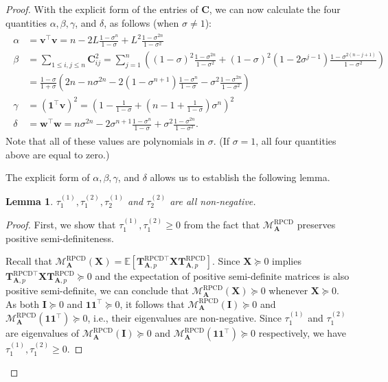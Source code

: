 \documentclass{article}
\theoremstyle{plain}
\newtheorem{lemma}[theorem]{Lemma}
\theoremstyle{definition}
\theoremstyle{remark}
\def\bigopen#1{\left(#1\right)}
\newcommand{\RPCD}{\text{RPCD}} %
\newcommand{\MARPCD}{\mathcal{M}_{\bm{A}}^{\RPCD}} %
\def\vone{{\bm{1}}}
\def\vv{{\bm{v}}}
\def\vw{{\bm{w}}}
\def\mA{{\bm{A}}}
\def\mC{{\bm{C}}}
\def\mI{{\bm{I}}}
\def\mT{{\bm{T}}}
\def\mX{{\bm{X}}}
\newcommand{\E}{\mathbb{E}}
\begin{document}
\begin{proof}
With the explicit form of the entries of $\mC$, we can now calculate the four quantities $\alpha, \beta, \gamma$, and $\delta$, as follows (when $\sigma \ne 1$):
\begin{align}
\begin{aligned}
\alpha &= \vv^{\top} \vv =  n - 2L\frac{1-\sigma^n}{1-\sigma} + L^2\frac{1-\sigma^{2n}}{1-\sigma^2}\\
\beta &= \sum_{1\le i,j\le n} \mC_{ij}^2 = \sum_{j=1}^n \bigopen{(1-\sigma)^2 \frac{1-\sigma^{2n}}{1-\sigma^2} + (1-\sigma)^2(1-2\sigma^{j-1})\frac{1-\sigma^{2(n-j+1)}}{1-\sigma^2}}\\
&= \frac{1-\sigma}{1+\sigma} \bigopen{2n - n\sigma^{2n}-2(1-\sigma^{n+1})\frac{1-\sigma^n}{1-\sigma} - \sigma^2\frac{1-\sigma^{2n}}{1-\sigma^2}}\\
\gamma &=  \bigopen{\vone^{\top} \vv}^2 =\bigopen{1-\frac{1}{1-\sigma} + \bigopen{n-1+\frac{1}{1-\sigma}} \sigma^n}^2\\
\delta &= \vw^{\top} \vw = n\sigma^{2n}-2\sigma^{n+1}\frac{1-\sigma^n}{1-\sigma}+\sigma^2\frac{1-\sigma^{2n}}{1-\sigma^2}.
\end{aligned} \label{eq:abcd}
\end{align}
Note that all of these values are polynomials in $\sigma$.
(If $\sigma = 1$, all four quantities above are equal to zero.)

The explicit form of $\alpha, \beta, \gamma$, and $\delta$ allows us to establish the following lemma.
\begin{lemma}
    \label{lem:taunonnegative}
    $\tau_1^{(1)}, \tau_1^{(2)}, \tau_2^{(1)}$ and $\tau_2^{(2)}$ are all non-negative.
\end{lemma}
\begin{proof}
    First, we show that $\tau_1^{(1)}, \tau_1^{(2)} \ge 0$ from the fact that $\MARPCD$ preserves positive semi-definiteness. 
    
    Recall that $\MARPCD(\mX) = \E[\mT_{\mA, p}^{\RPCD \top} \mX \mT_{\mA, p}^{\RPCD}]$.
    Since $\mX \succeq 0$ implies $\mT_{\mA, p}^{\RPCD \top} \mX \mT_{\mA, p}^{\RPCD} \succeq 0$ and the expectation of positive semi-definite matrices is also positive semi-definite, we can conclude that $\MARPCD(\mX) \succeq 0$ whenever $\mX \succeq 0$.
    As both $\mI \succeq 0$ and $\vone \vone^{\top} \succeq 0$, it follows that $\MARPCD(\mI) \succeq 0$ and $\MARPCD(\vone \vone^{\top}) \succeq 0$, i.e., their eigenvalues are non-negative.
    Since $\tau_1^{(1)}$ and $\tau_1^{(2)}$ are eigenvalues of $\MARPCD(\mI) \succeq 0$ and $\MARPCD(\vone \vone^{\top}) \succeq 0$ respectively, we have $\tau_1^{(1)}, \tau_1^{(2)} \ge 0$.
    

\end{proof}
\end{proof}
\end{document}
